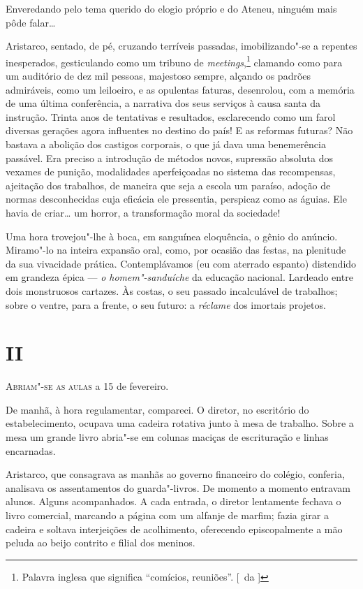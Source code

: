 Enveredando pelo tema
querido do elogio próprio e do Ateneu, ninguém mais pôde falar\ldots{}

Aristarco, sentado, de pé, cruzando terríveis passadas,
imobilizando"-se a repentes inesperados, gesticulando como um tribuno
de \textit{meetings},\footnote{ Palavra inglesa que significa 
``comícios, reuniões''. [~da ]} clamando 
como para um auditório de dez mil pessoas,
majestoso sempre, alçando os padrões admiráveis, como um leiloeiro, e
as opulentas faturas, desenrolou, com a memória de uma última
conferência, a narrativa dos seus serviços à causa santa da instrução.
Trinta anos de tentativas e resultados, esclarecendo como um farol
diversas gerações agora influentes no destino do país! E as reformas
futuras? Não bastava a abolição dos castigos corporais, o que já dava
uma benemerência passável. Era preciso a introdução de métodos novos,
supressão absoluta dos vexames de punição, modalidades aperfeiçoadas no
sistema das recompensas, ajeitação dos trabalhos, de maneira que seja a
escola um paraíso, adoção de normas desconhecidas cuja eficácia ele
pressentia, perspicaz como as águias. Ele havia de criar\ldots{} um horror,
a transformação moral da sociedade! 

Uma hora trovejou"-lhe à boca, em
sanguínea eloquência, o gênio do anúncio. Miramo"-lo na inteira
expansão oral, como, por ocasião das festas, na plenitude da sua
vivacidade prática. Contemplávamos (eu com aterrado espanto) distendido
em grandeza épica --- \textit{o homem"-sanduíche} da educação nacional. Lardeado
entre dois monstruosos cartazes. Às costas, o seu passado incalculável
de trabalhos; sobre o ventre, para a frente, o seu futuro: a \textit{réclame}
dos imortais projetos.


\section{II}

\noindent\textsc{Abriam"-se as aulas} a 15 de fevereiro. 

De manhã, à hora regulamentar, compareci. 
O diretor, no escritório do estabelecimento, ocupava uma
cadeira rotativa junto à mesa de trabalho. Sobre a mesa um grande livro
abria"-se em colunas maciças de escrituração e linhas encarnadas.

Aristarco, que consagrava as manhãs ao governo financeiro do colégio,
conferia, analisava os assentamentos do guarda"-livros. De momento a
momento entravam alunos. Alguns acompanhados. A cada entrada, o diretor
lentamente fechava o livro comercial, marcando a página com um alfanje
de marfim; fazia girar a cadeira e soltava interjeições de acolhimento,
oferecendo episcopalmente a mão peluda ao beijo contrito e filial dos meninos. 

